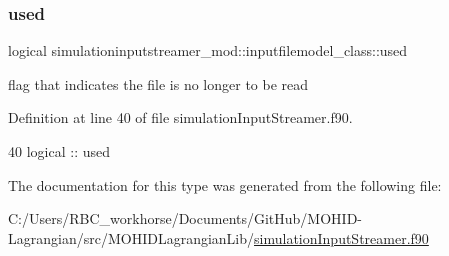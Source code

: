 \subsubsection{\texorpdfstring{used}{used}}
{\footnotesize\ttfamily logical simulationinputstreamer\+\_\+mod\+::inputfilemodel\+\_\+class\+::used\hspace{0.3cm}{\ttfamily [private]}}



flag that indicates the file is no longer to be read 



Definition at line 40 of file simulation\+Input\+Streamer.\+f90.


\begin{DoxyCode}
40         \textcolor{keywordtype}{logical} :: used
\end{DoxyCode}


The documentation for this type was generated from the following file\+:\begin{DoxyCompactItemize}
\item 
C\+:/\+Users/\+R\+B\+C\+\_\+workhorse/\+Documents/\+Git\+Hub/\+M\+O\+H\+I\+D-\/\+Lagrangian/src/\+M\+O\+H\+I\+D\+Lagrangian\+Lib/\mbox{\hyperlink{simulation_input_streamer_8f90}{simulation\+Input\+Streamer.\+f90}}\end{DoxyCompactItemize}
